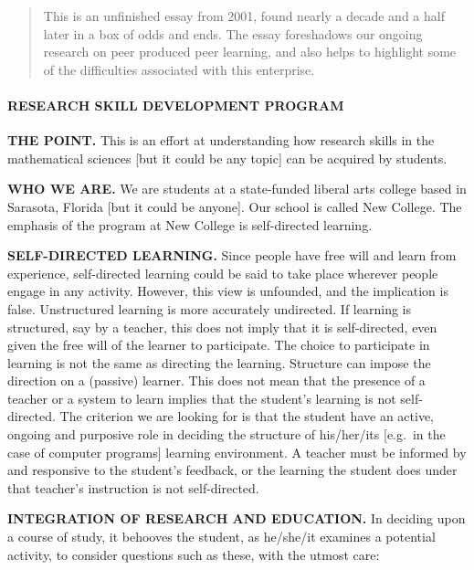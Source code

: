 \begin{quote}
This is an unfinished essay from 2001, found nearly a decade and a half
later in a box of odds and ends. The essay foreshadows our ongoing
research on peer produced peer learning, and also helps to highlight
some of the difficulties associated with this enterprise.
\end{quote}

\hypertarget{research-skill-development-program}{%
\paragraph{RESEARCH SKILL DEVELOPMENT
PROGRAM}\label{research-skill-development-program}}

\textbf{THE POINT.} This is an effort at understanding how research
skills in the mathematical sciences {[}but it could be any topic{]} can
be acquired by students.

\textbf{WHO WE ARE.} We are students at a state-funded liberal arts
college based in Sarasota, Florida {[}but it could be anyone{]}. Our
school is called New College. The emphasis of the program at New College
is self-directed learning.

\textbf{SELF-DIRECTED LEARNING.} Since people have free will and learn
from experience, self-directed learning could be said to take place
wherever people engage in any activity. However, this view is unfounded,
and the implication is false. Unstructured learning is more accurately
undirected. If learning is structured, say by a teacher, this does not
imply that it is self-directed, even given the free will of the learner
to participate. The choice to participate in learning is not the same as
directing the learning. Structure can impose the direction on a
(passive) learner. This does not mean that the presence of a teacher or
a system to learn implies that the student's learning is not
self-directed. The criterion we are looking for is that the student have
an active, ongoing and purposive role in deciding the structure of
his/her/its {[}e.g.~in the case of computer programs{]} learning
environment. A teacher must be informed by and responsive to the
student's feedback, or the learning the student does under that
teacher's instruction is not self-directed.

\textbf{INTEGRATION OF RESEARCH AND EDUCATION.} In deciding upon a
course of study, it behooves the student, as he/she/it examines a
potential activity, to consider questions such as these, with the utmost
care:

